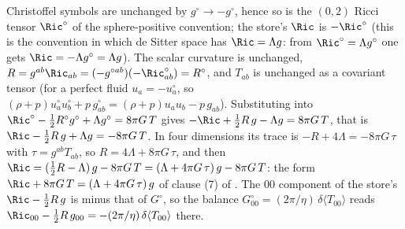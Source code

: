 Christoffel symbols are unchanged by $g^{\circ} \to -g^{\circ}$, hence so is the $(0,2)$ Ricci tensor $\Ric^{\circ}$ of the sphere-positive convention; the store's $\Ric$ is $-\Ric^{\circ}$ (this is the convention in which de Sitter space has $\Ric = \Lambda g$: from $\Ric^{\circ} = \Lambda g^{\circ}$ one gets $\Ric = -\Lambda g^{\circ} = \Lambda g$). The scalar curvature is unchanged, $R = g^{ab}\Ric_{ab} = (-g^{\circ ab})(-\Ric^{\circ}_{ab}) = R^{\circ}$, and $T_{ab}$ is unchanged as a covariant tensor (for a perfect fluid $u_{a} = -u^{\circ}_{a}$, so $(\rho + p)u^{\circ}_{a}u^{\circ}_{b} + p\,g^{\circ}_{ab} = (\rho + p)u_{a}u_{b} - p\,g_{ab}$). Substituting into $\Ric^{\circ} - \tfrac12 R^{\circ}g^{\circ} + \Lambda g^{\circ} = 8\pi G\,T$ gives $-\Ric + \tfrac12 R\,g - \Lambda g = 8\pi G\,T$, that is $\Ric - \tfrac12 R\,g + \Lambda g = -8\pi G\,T$. In four dimensions its trace is $-R + 4\Lambda = -8\pi G\,\tau$ with $\tau = g^{ab}T_{ab}$, so $R = 4\Lambda + 8\pi G\,\tau$, and then $\Ric = (\tfrac12 R - \Lambda)\,g - 8\pi G\,T = (\Lambda + 4\pi G\,\tau)\,g - 8\pi G\,T$: the form $\Ric + 8\pi G\,T = (\Lambda + 4\pi G\,\tau)\,g$ of clause (7) of . The $00$ component of the store's $\Ric - \tfrac12 R\,g$ is minus that of $G^{\circ}$, so the balance $G^{\circ}_{00} = (2\pi/\eta)\,\delta\langle T_{00}\rangle$ reads $\Ric_{00} - \tfrac12 R\,g_{00} = -(2\pi/\eta)\,\delta\langle T_{00}\rangle$ there.
